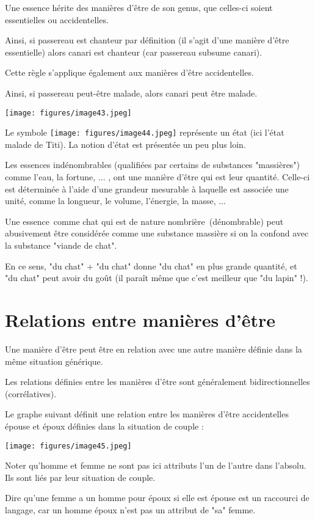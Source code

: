 \documentclass[a4paper, 12pt, openright, french]{book}
\begin{document}
Une essence hérite des manières d'être de son genus, que
celles-ci soient essentielles ou accidentelles.

Ainsi, si passereau est chanteur par définition (il
s'agit d'une manière
d'être essentielle) alors canari est chanteur (car
passereau subsume canari).

Cette règle s'applique également aux manières
d'être accidentelles.

Ainsi, si passereau peut-être malade, alors canari peut être malade.

\texttt{[image: figures/image43.jpeg]}

Le symbole
\texttt{[image: figures/image44.jpeg]}
représente un état (ici l'état malade de Titi). La
notion d'état est présentée un peu plus loin.

Les essences indénombrables (qualifiées par certains de substances
"massières") comme l'eau, la fortune, ... , ont une
manière d'être qui est leur quantité. Celle-ci est
déterminée à l'aide d'une grandeur
mesurable à laquelle est associée une unité, comme la longueur, le
volume, l'énergie, la masse, ...

Une essence~comme chat qui est de nature nombrière~(dénombrable) peut
abusivement être considérée comme une substance massière si on la
confond avec la substance "viande de chat".

En ce sens, "du chat" + "du chat" donne "du chat" en plus grande
quantité, et "du chat" peut avoir du goût (il paraît même que c'est
meilleur que "du lapin" !).

\newpage
\section{Relations entre manières d'être}

Une manière d'être peut être en relation avec une autre
manière définie dans la même situation générique.

Les relations définies entre les manières d'être sont
généralement bidirectionnelles (corrélatives).

Le graphe suivant définit une relation entre les manières
d'être accidentelles épouse et époux définies dans la
situation de couple :

\texttt{[image: figures/image45.jpeg]}

Noter qu'homme et femme ne sont pas ici attributs
l'un de l'autre dans
l'absolu. Ils sont liés par leur situation de couple.

Dire qu'une femme a un homme pour époux si elle est
épouse est un raccourci de langage, car un homme époux
n'est pas un attribut de "sa" femme.
\end{document}
